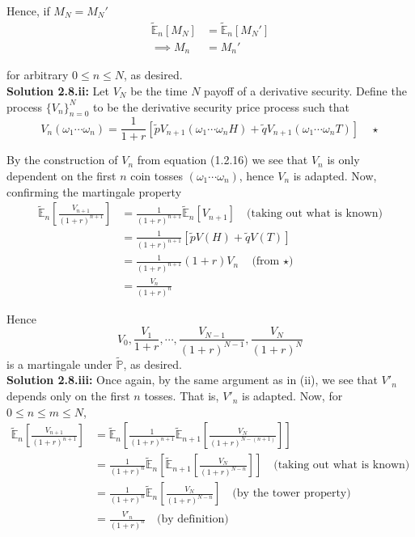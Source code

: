 \documentclass[12pt]{article}
\newlength\tindent
\renewcommand{\indent}{\hspace*{\tindent}}
\renewcommand{\P}{\mathbb P}
\newcommand{\E}{\mathbb E}
\begin{document}
Hence, if $M_N = M_N'$
\begin{align*}
	\tilde{\E}_n[M_N] &= \tilde{\E}_n[M_N'] \\
	\implies M_n &= M_n'
\end{align*}

for arbitrary $0 \leq n \leq N$, as desired. \\

{\bf Solution 2.8.ii:} Let $V_N$ be the time $N$ payoff of a derivative security. Define the process $\{V_n\}^N_{n = 0}$ to be the derivative security price process such that
\begin{equation*}
	V_n(\omega_1\cdots\omega_n) = \frac{1}{1 + r} \left[ \tilde{p}V_{n + 1}(\omega_1\cdots\omega_n H) + \tilde{q}V_{n + 1}(\omega_1\cdots\omega_n T) \right] \quad \star
\end{equation*}

\indent By the construction of $V_n$ from equation (1.2.16) we see that $V_n$ is only dependent on the first $n$ coin tosses $(\omega_1\cdots\omega_n)$, hence $V_n$ is adapted. Now, confirming the martingale property
\begin{align*}
	\tilde{\E}_n \left[ \frac{V_{n + 1}}{(1 + r)^{n + 1}} \right] &= \frac{1}{(1 + r)^{n + 1}} \tilde{\E}_n \left[ V_{n + 1} \right] \quad \text{(taking out what is known)} \\
	&= \frac{1}{(1 + r)^{n + 1}} \left[ \tilde{p}V(H) + \tilde{q}V(T) \right] \\
	&= \frac{1}{(1 + r)^{n + 1}}(1 + r)V_n \quad \text{(from $\star$)} \\
	&= \frac{V_n}{(1 + r)^n}
\end{align*}

Hence
\begin{equation*}
	V_0, \frac{V_1}{1 + r}, \cdots, \frac{V_{N - 1}}{(1 + r)^{N - 1}}, \frac{V_N}{(1 + r)^N}
\end{equation*}
is a martingale under $\tilde{\P}$, as desired. \\

{\bf Solution 2.8.iii:} Once again, by the same argument as in (ii), we see that $V'_n$ depends only on the first $n$ tosses. That is, $V'_n$ is adapted. Now, for $0 \leq n \leq m \leq N$,
\begin{align*}
	\tilde{\E}_n \left[ \frac{V_{n + 1}}{(1 + r)^{n + 1}} \right] &= \tilde{\E}_n \left[  \frac{1}{(1 + r)^{n + 1}} \tilde{\E}_{n + 1} \left[ \frac{V_N}{(1 + r)^{N - (n + 1)}} \right] \right] \\
	&= \frac{1}{(1 + r)^n} \tilde{\E}_n \left[ \tilde{\E}_{n + 1} \left[ \frac{V_N}{(1 + r)^{N - n}} \right] \right] \quad \text{(taking out what is known)} \\
	&= \frac{1}{(1 + r)^n} \tilde{\E}_n \left[ \frac{V_N}{(1 + r)^{N - n}} \right] \quad \text{(by the tower property)} \\
	&= \frac{V'_n}{(1 + r)^n} \quad \text{(by definition)}
\end{align*}
\end{document}

